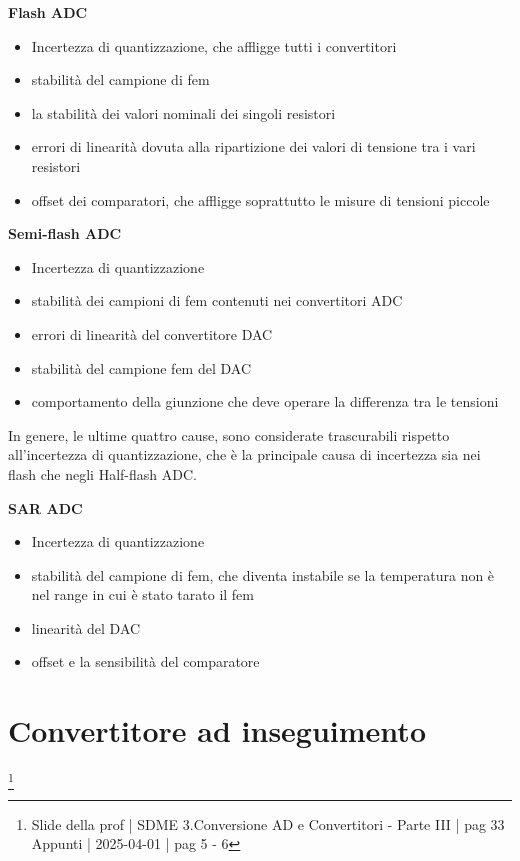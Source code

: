 \textbf{Flash ADC} 

\begin{itemize}
    \item Incertezza di quantizzazione, che affligge tutti i convertitori 
    \item stabilità del campione di fem 
    \item la stabilità dei valori nominali dei singoli resistori 
    \item errori di linearità dovuta alla ripartizione dei valori di tensione tra i vari resistori 
    \item offset dei comparatori, che affligge soprattutto le misure di tensioni piccole 
\end{itemize}

\textbf{Semi-flash ADC} 

\begin{itemize}
    \item Incertezza di quantizzazione 
    \item stabilità dei campioni di fem contenuti nei convertitori ADC 
    \item errori di linearità del convertitore DAC 
    \item stabilità del campione fem del DAC 
    \item comportamento della giunzione che deve operare la differenza tra le tensioni
\end{itemize}

In genere, le ultime quattro cause, sono considerate trascurabili rispetto all'incertezza di quantizzazione, che è la principale causa di incertezza sia nei flash che negli Half-flash ADC. \newline 

\textbf{SAR ADC} 

\begin{itemize}
    \item Incertezza di quantizzazione 
    \item stabilità del campione di fem, che diventa instabile se la temperatura non è nel range in cui è stato tarato il fem 
    \item linearità del DAC 
    \item offset e la sensibilità del comparatore
\end{itemize}


\newpage 

\section{Convertitore ad inseguimento}
\footnote{Slide della prof | SDME 3.Conversione AD e Convertitori - Parte III | pag 33 \\  
Appunti | 2025-04-01 | pag 5 - 6 }

